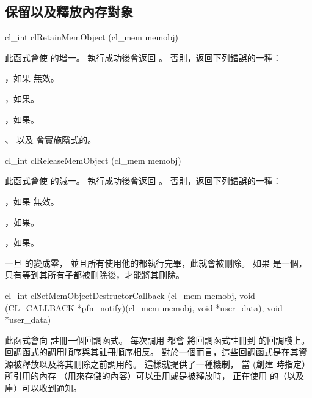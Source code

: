 \subsection{保留以及釋放內存對象}


\startCLFUNC
cl_int clRetainMemObject (cl_mem memobj)
\stopCLFUNC

此函式會使  的增一。
執行成功後會返回 。
否則，返回下列錯誤的一種：
\startigBase
\item {}，如果  無效。

\item {}，如果\scdevfailres。

\item {}，如果\schostfailres。
\stopigBase

、  以及 
會實施隱式的。


\startCLFUNC
cl_int clReleaseMemObject (cl_mem memobj)
\stopCLFUNC

此函式會使  的減一。
執行成功後會返回 。
否則，返回下列錯誤的一種：
\startigBase
\item {}，如果  無效。

\item {}，如果\scdevfailres。

\item {}，如果\schostfailres。
\stopigBase

一旦  的變成零，
並且所有使用他的都執行完畢，此就會被刪除。
如果  是一個，
只有等到其所有子都被刪除後，才能將其刪除。


\startCLFUNC
cl_int clSetMemObjectDestructorCallback (cl_mem memobj,
		void (CL_CALLBACK *pfn_notify)(cl_mem memobj,
			void *user_data),
		void *user_data)
\stopCLFUNC

此函式會向  註冊一個回調函式。
每次調用  都會
將回調函式註冊到  的回調棧上。
回調函式的調用順序與其註冊順序相反。
對於一個而言，這些回調函式是在其資源被釋放以及將其刪除之前調用的。
這樣就提供了一種機制，
當  (創建  時指定）所引用的內存
（用來存儲的內容）可以重用或是被釋放時，
正在使用  的（以及庫）可以收到通知。

